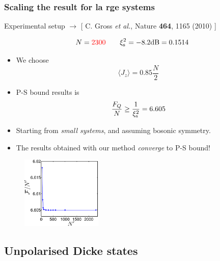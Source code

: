 \documentclass{beamer}
\newcommand{\expect}[1]{\ensuremath{\langle #1 \rangle}}
\newcommand{\citate}[1]{{\footnotesize{\color{gray}[ #1 ]}}

	}
\begin{document}
		\begin{frame}
			\frametitle{Scaling the result for la rge systems}

			{\small Experimental setup $\rightarrow$ \citate{C. Gross {\it et al.}, Nature {\bf 464}, 1165 (2010)}}
				\begin{block}
					{}
					\[
					N = {\color{red}2300}\qquad \xi^2_{\rm s} =-8.2{\rm dB}=0.1514
					\]
					\vspace{-12px}
				\end{block}
				\begin{itemize}
					\item<2-> We choose
					\[ \expect{J_z} = 0.85 \frac{N}{2}
					\]
					\item<3-> P-S bound results is
					\[
					\frac{F_Q}{N} \geq \frac{1}{\xi_{\rm s}^2} = 6.605
					\]
				\end{itemize}
		\end{frame}

		\begin{frame}

			\begin{itemize}
				\item Starting from \emph{\color{blue}small systems}, and assuming bosonic symmetry.
				\vspace{5px}
				\item The results obtained with our method \emph{\color{blue}converge} to P-S bound!
			\end{itemize}
			\begin{figure}
				\includegraphics[height=130px]{img/scaling-spsq.pdf}
			\end{figure}

		\end{frame}

	\subsection{Unpolarised Dicke states}
\end{document}
